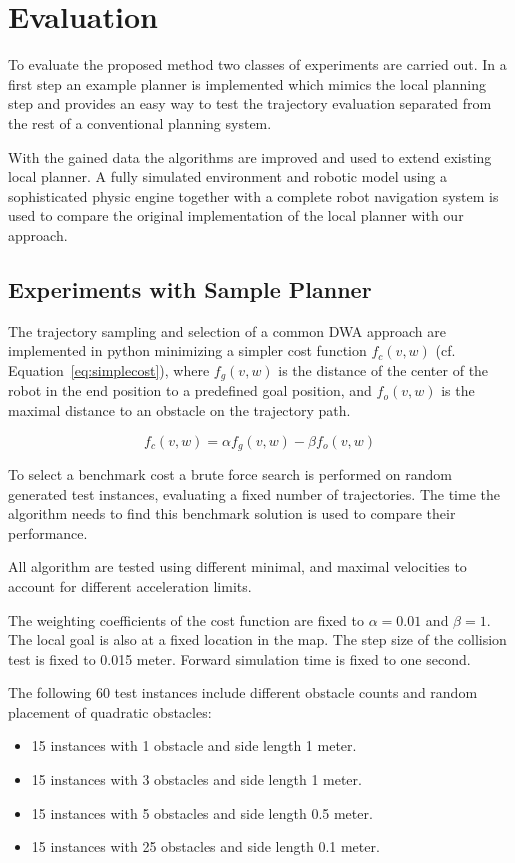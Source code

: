 \chapter{Evaluation}\label{ch:eval}
To evaluate the proposed method two classes of experiments are carried out. In a first step an example planner is implemented which mimics the local planning step and provides an easy way to test the trajectory evaluation separated from the rest of a conventional planning system.

With the gained data the algorithms are improved and used to extend existing local planner. A fully simulated environment and robotic model using a sophisticated physic engine together with a complete robot navigation system is used to compare the original implementation of the local planner with our approach.
 
\section{Experiments with Sample Planner}
The trajectory sampling and selection of a common DWA approach are implemented in python minimizing a simpler cost function $f_c(v,w)$ (cf. Equation~\ref{eq:simplecost}), where $f_g(v,w)$ is the distance of the center of the robot in the end position to a predefined goal position, and $f_o(v,w)$ is the maximal distance to an obstacle on the trajectory path.

\begin{equation}
   f_c(v,w)=\alpha f_g(v,w) - \beta f_o(v,w)
   \label{eq:simplecost}
\end{equation}

To select a benchmark cost a brute force search is performed on random generated test instances, evaluating a fixed number of trajectories. 
The time the algorithm needs to find this benchmark solution is used to compare their performance.

All algorithm are tested using different minimal, and maximal velocities to account for different acceleration limits. 

The weighting coefficients of the cost function are fixed to $\alpha=0.01$ and $\beta=1$. The local goal is also at a fixed location in the map. 
The step size of the collision test is fixed to 0.015 meter. 
Forward simulation time is fixed to one second. 

The following 60 test instances include different obstacle counts and random placement of quadratic obstacles:
\begin{itemize}
\item 15 instances with 1 obstacle and side length 1 meter.
\item 15 instances with 3 obstacles and side length 1 meter.
\item 15 instances with 5 obstacles and side length 0.5 meter.
\item 15 instances with 25 obstacles and side length 0.1 meter.
\end{itemize}

